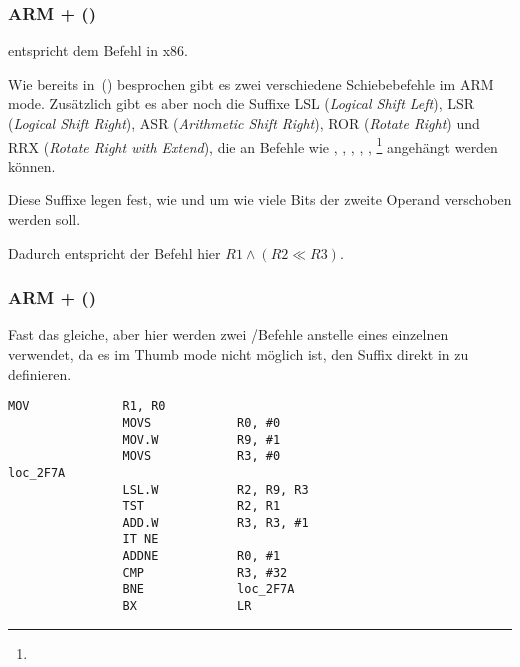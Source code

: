 \subsubsection{ARM + \OptimizingXcodeIV (\ARMMode)}



\TST entspricht dem Befehl \TEST in x86.

Wie bereits in~() besprochen gibt es zwei verschiedene
Schiebebefehle im ARM mode.
Zusätzlich gibt es aber noch die Suffixe
LSL (\emph{Logical Shift Left}), 
LSR (\emph{Logical Shift Right}), 
ASR (\emph{Arithmetic Shift Right}), 
ROR (\emph{Rotate Right}) und
RRX (\emph{Rotate Right with Extend}), die an Befehle wie \MOV, \TST,
\CMP, \ADD, \SUB, \RSB\footnote{\DataProcessingInstructionsFootNote} angehängt
werden können.

Diese Suffixe legen fest, wie und um wie viele Bits der zweite Operand
verschoben werden soll.

Dadurch entspricht der Befehl  hier 
$R1 \land (R2 \ll R3)$.

\subsubsection{ARM + \OptimizingXcodeIV (\ThumbTwoMode)}

Fast das gleiche, aber hier werden zwei /\TST Befehle anstelle eines
einzelnen \TST verwendet, da es im Thumb mode nicht möglich ist, den Suffix \LSL
direkt in \TST zu definieren.

\begin{lstlisting}[label=ARM_leaf_example5,style=customasmARM]
                MOV             R1, R0
                MOVS            R0, #0
                MOV.W           R9, #1
                MOVS            R3, #0
loc_2F7A
                LSL.W           R2, R9, R3
                TST             R2, R1
                ADD.W           R3, R3, #1
                IT NE
                ADDNE           R0, #1
                CMP             R3, #32
                BNE             loc_2F7A
                BX              LR
\end{lstlisting}

